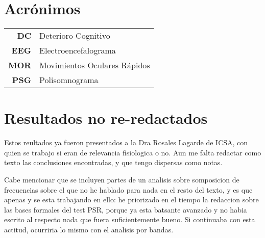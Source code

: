 \documentclass[12pt,a4paper]{mitthesis}
\begin{document}




\tableofcontents
\newpage


\chapter*{Acr\'onimos}

\begin{tabular}{rl}
\textbf{DC} & Deterioro Cognitivo
\\
\textbf{EEG} & Electroencefalograma
\\
\textbf{MOR} & Movimientos Oculares R\'apidos
\\
\textbf{PSG} & Polisomnograma
\end{tabular}


















\appendix

\chapter{Resultados no re-redactados}

Estos reultados ya fueron presentados a la Dra Rosales Lagarde de ICSA, con quien se
trabajo si eran de relevancia fisiologica o no. Aun me falta redactar como texto las conclusiones
encontradas, y que tengo dispersas como notas. 

Cabe mencionar que se incluyen partes de un analisis
sobre somposicion de frecuencias sobre el que no he hablado para nada en el resto del texto,
y es que apenas y se esta trabajando en ello: he priorizado en el tiempo la redaccion
sobre  las bases
formales del test PSR, porque ya esta batsante avanzado y no habia escrito al respecto nada que fuera
suficientemente bueno. Si continuaba con esta actitud, ocurriria lo mismo con el analisis por bandas.
\end{document}
